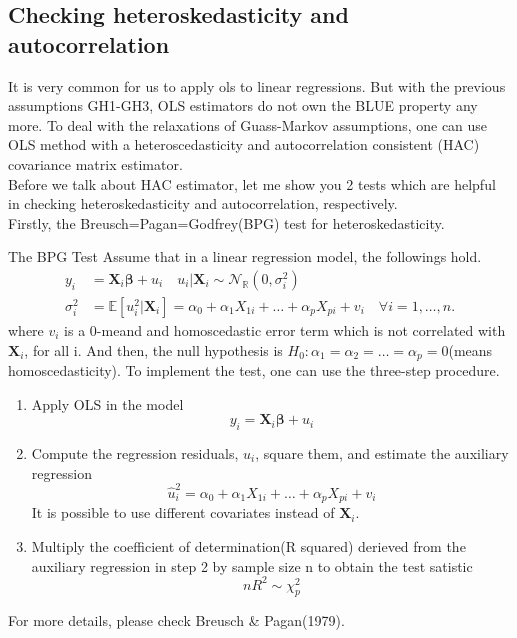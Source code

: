 \documentclass{article}
\theoremstyle{definition}
\begin{document}
\subsection{Checking heteroskedasticity and autocorrelation}
It is very common for us to apply ols to linear regressions. But with the previous assumptions GH1-GH3, OLS estimators do not own the BLUE property any more. To deal with the relaxations of Guass-Markov assumptions, one can use OLS method with a heteroscedasticity and autocorrelation consistent (HAC) covariance matrix estimator.\\
Before we talk about HAC estimator, let me show you 2 tests which are helpful in checking heteroskedasticity and autocorrelation, respectively.\\
Firstly, the Breusch=Pagan=Godfrey(BPG) test for heteroskedasticity.\\

\begin{itembox}[1]{The BPG Test}
Assume that in a linear regression model, the followings hold.\\
\begin{equation*}
	\begin{split}
		y_i & = \bm{X}_i \bm{\beta} + u_i \quad u_i|\bm{X}_i \sim \mathcal{N}_{\mathbb{R}}(0, \sigma^2_i) \\
		\sigma^2_i & = \mathbb{E}[u_i^2|\bm{X}_i] = \alpha_0 + \alpha_1 X_{1i} + \dots + \alpha_{p} X_{pi}  + v_i \quad \forall i = 1, \dots, n.
	\end{split}
\end{equation*}
where $v_i$ is a 0-meand and homoscedastic error term which is not correlated with $\bm{X}_i$, for all i.
And then, the null hypothesis is $H_0 : \alpha_1 = \alpha_2 = \dots = \alpha_p = 0$(means homoscedasticity). To implement the test, one can use the three-step procedure.
\begin{enumerate}[step1]
\item
Apply OLS in the model
\begin{equation*}
	y_i  = \bm{X}_i \bm{\beta} + u_i
\end{equation*}
\item
Compute the regression residuals, $\hat{u}_i$, square them, and estimate the auxiliary regression
\begin{equation*}
	\hat{u}_i^2 = \alpha_0 + \alpha_1 X_{1i} + \dots + \alpha_{p} X_{pi}  + v_i
\end{equation*}
It is possible to use different covariates instead of $\bm{X}_i$.
\item
Multiply the coefficient of determination(R squared) derieved from the auxiliary regression in step 2 by sample size n to obtain the test satistic
\begin{equation*}
	n R^2 \sim \chi^2_{p}
\end{equation*}
\end{enumerate}

 For more details, please check Breusch \& Pagan(1979)\cite{BPG}.
\end{itembox}
\end{document}
